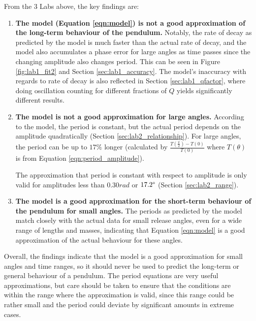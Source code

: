 \documentclass[aps,twocolumn,secnumarabic,nobalancelastpage,amsmath,amssymb,nofootinbib,floatfix,letterpaper]{revtex4}
\begin{document}
From the 3 Labs above, the key findings are:
\begin{enumerate}
    \item
        \textbf{The model (Equation \ref{eqn:model}) is not a good approximation of the long-term behaviour of the
        pendulum.} Notably, the rate of decay as predicted by the model is much faster than the actual rate of decay,
        and the model also accumulates a phase error for large angles as time passes since the changing amplitude
        also changes period. This can be seen in Figure \ref{fig:lab1_fit2} and Section \ref{sec:lab1_accuracy}.
        The model's inaccuracy with regards to rate of decay is also reflected in Section \ref{sec:lab1_qfactor},
        where doing oscillation counting for different fractions of \(Q\) yields significantly different results.
    \item
        \textbf{The model is not a good approximation for large angles.} According to the model, the period is constant,
        but the actual period depends on the amplitude quadratically (Section \ref{sec:lab2_relationship}). For large
        angles, the period can be up to \(17\%\) longer (calculated by \(\frac{T\left(\frac{\pi}{2}\right) - T(0)}{T(0)}\)
        where \(T(\theta)\) is from Equation \ref{eqn:period_amplitude}).

        The approximation that period is constant with respect to amplitude is only valid for amplitudes less than
        \(0.30\si{rad}\) or \(17.2\degree\) (Section \ref{sec:lab2_range}).
    \item
        \textbf{The model is a good approximation for the short-term behaviour of the pendulum for small angles.}
        The periods as predicted by the model match closely with the actual data for small release angles, even for a
        wide range of lengths and masses, indicating that Equation \ref{eqn:model} is a good approximation of the actual
        behaviour for these angles.
\end{enumerate}

Overall, the findings indicate that the model is a good approximation for small angles and time ranges, so it should
never be used to predict the long-term or general behaviour of a pendulum. The period equations are very useful
approximations, but care should be taken to ensure that the conditions are within the range where the approximation is
valid, since this range could be rather small and the period could deviate by significant amounts in extreme cases.
\end{document}
